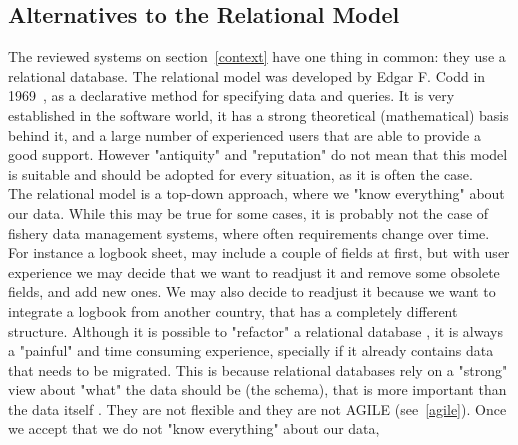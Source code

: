 \documentclass[11pt]{article} %
\begin{document}
\subsection{Alternatives to the Relational Model}\label{nosql}
The reviewed systems on section~\ref{context} have one thing in common: they use a relational database. The relational model was developed by Edgar F. Codd in 1969~\cite{relational}, as a declarative method for specifying data and queries. It is very established in the software world, it has a strong theoretical (mathematical) basis behind it, and a large number of experienced users that are able to provide a good support. However "antiquity" and "reputation" do not mean that this model is suitable and should be adopted for every situation, as it is often the case.\\
The relational model is a top-down approach, where we "know everything" about our data. While this may be true for some cases, it is probably not the case of fishery data management systems, where often requirements change over time. For instance a logbook sheet, may include a couple of fields at first, but with user experience we may decide that we want to readjust it and remove some obsolete fields, and add new ones. We may also decide to readjust it because we want to integrate a logbook from another country, that has a completely different structure. Although it is possible to "refactor" a relational database , it is always a "painful" and time consuming experience, specially if it already contains data that needs to be migrated. This is because relational databases rely on a "strong" view about "what" the data should be (the schema), that is more important than the data itself . They are not flexible and they are not AGILE (see~\ref{agile}). Once we accept that we do not "know everything" about our data,
 
\end{document}
